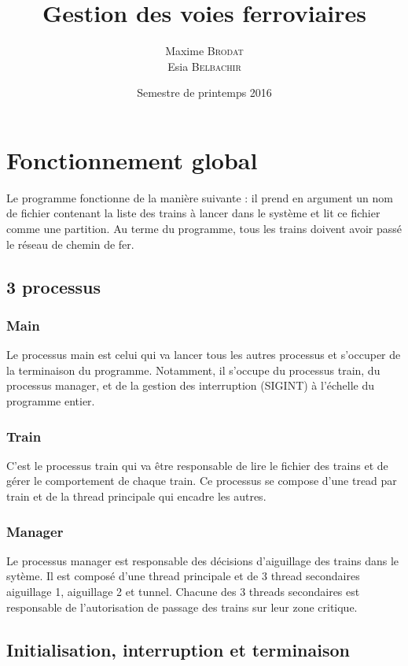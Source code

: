 \documentclass[a4paper,12pt]{article}
\title{Gestion des voies ferroviaires}{Projet de LO41}
\author{Maxime \textsc{Brodat} \\ Esia \textsc{Belbachir}}
\date{Semestre de printemps 2016}
\begin{document}
\maketitlepage

\tableofcontents
\pagebreak


\section{Fonctionnement global}

Le programme fonctionne de la manière suivante : il prend en argument un nom de fichier contenant la liste des trains à lancer dans le système et lit ce fichier comme une partition. Au terme du programme, tous les trains doivent avoir passé le réseau de chemin de fer.

\subsection{3 processus}

\subsubsection{Main}

Le processus main est celui qui va lancer tous les autres processus et s'occuper de la terminaison du programme. Notamment, il s'occupe du processus train, du processus manager, et de la gestion des interruption (SIGINT) à l'échelle du programme entier.

\subsubsection{Train}

C'est le processus train qui va être responsable de lire le fichier des trains et de gérer le comportement de chaque train. Ce processus se compose d'une tread par train et de la thread principale qui encadre les autres.

\subsubsection{Manager}

Le processus manager est responsable des décisions d'aiguillage des trains dans le sytème. Il est composé d'une thread principale et de 3 thread secondaires aiguillage 1, aiguillage 2 et tunnel. Chacune des 3 threads secondaires est responsable de l'autorisation de passage des trains sur leur zone critique.

\subsection{Initialisation, interruption et terminaison}
\end{document}
